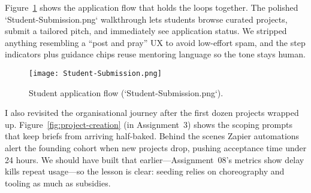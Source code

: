 Figure~\ref{fig:application-flow} shows the application flow that holds the loops together. The polished `Student-Submission.png` walkthrough lets students browse curated projects, submit a tailored pitch, and immediately see application status. We stripped anything resembling a ``post and pray'' UX to avoid low-effort spam, and the step indicators plus guidance chips reuse mentoring language so the tone stays human.

\begin{figure}[h]
  \centering
  \texttt{[image: Student-Submission.png]}
  \caption{Student application flow (`Student-Submission.png`).}
  \label{fig:application-flow}
\end{figure}

I also revisited the organisational journey after the first dozen projects wrapped up. Figure~\ref{fig:project-creation} (in Assignment~3) shows the scoping prompts that keep briefs from arriving half-baked. Behind the scenes Zapier automations alert the founding cohort when new projects drop, pushing acceptance time under 24 hours. We should have built that earlier---Assignment~08's metrics show delay kills repeat usage---so the lesson is clear: seeding relies on choreography and tooling as much as subsidies.
